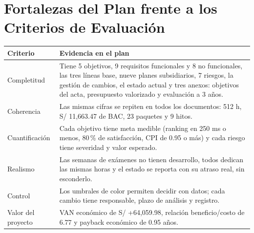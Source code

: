 \documentclass[11pt,a4paper]{article}
\begin{document}
\section{Fortalezas del Plan frente a los Criterios de Evaluación}
{\small
{}
\noindent\begin{tabularx}{\textwidth}{@{}P{3.0cm} L@{}}
\toprule
{}
\textbf{Criterio} & \textbf{Evidencia en el plan} \\
\midrule
Completitud & Tiene 5 objetivos, 9 requisitos funcionales y 8 no funcionales, las tres líneas base, nueve planes subsidiarios, 7 riesgos, la gestión de cambios, el estado actual y tres anexos: objetivos del acta, presupuesto valorizado y evaluación a 3 años. \\
Coherencia & Las mismas cifras se repiten en todos los documentos: 512 h, S/ 11,663.47 de BAC, 23 paquetes y 9 hitos. \\
Cuantificación & Cada objetivo tiene meta medible (ranking en 250 ms o menos, 80\,\% de satisfacción, CPI de 0.95 o más) y cada riesgo tiene severidad y valor esperado. \\
Realismo & Las semanas de exámenes no tienen desarrollo, todos dedican las mismas horas y el estado se reporta con su atraso real, sin esconderlo. \\
Control & Los umbrales de color permiten decidir con datos; cada cambio tiene responsable, plazo de análisis y registro. \\
Valor del proyecto & VAN económico de S/ +64,059.98, relación beneficio/costo de 6.77 y payback económico de 0.95 años. \\
\bottomrule
\end{tabularx}
}

\end{document}
